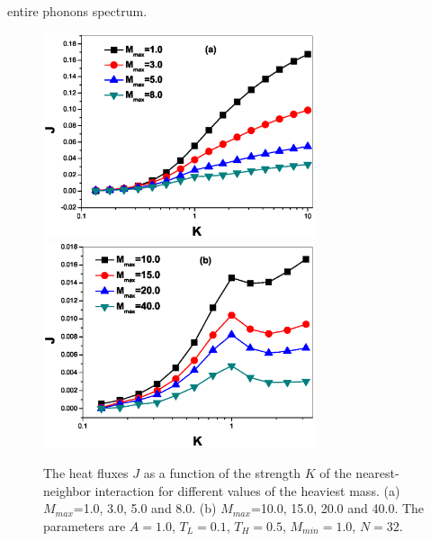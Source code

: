 \documentclass[pra,preprint,superscriptaddress,showkeys,showpacs]{revtex4}
\begin{document}
entire phonons spectrum.\\
\begin{figure}
\centering
\includegraphics[width=8cm]{fig6a.eps}
\centering
\includegraphics[width=8cm]{fig6b.eps}
\caption{The heat fluxes $J$ as a function of the strength $K$ of
the nearest-neighbor interaction for different values of the
heaviest mass. (a) $M_{max}$=1.0, 3.0, 5.0 and 8.0. (b)
$M_{max}$=10.0, 15.0, 20.0 and 40.0. The parameters are $A=1.0$,
$T_{L}=0.1$, $T_{H}=0.5$, $M_{min}=1.0$, $N=32$.}
\end{figure}
\end{document}
